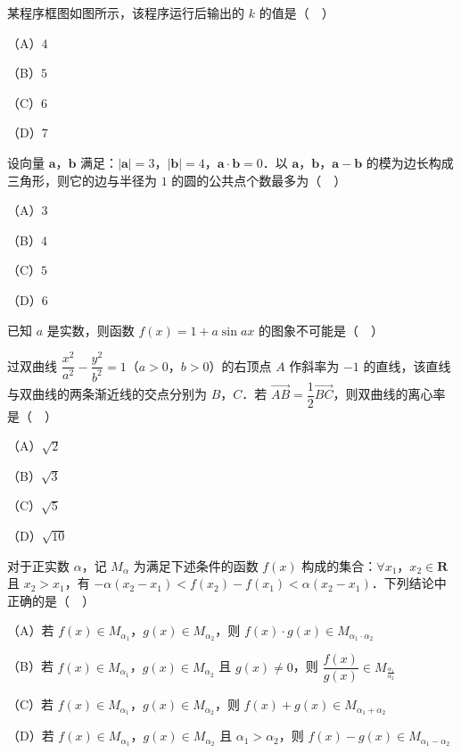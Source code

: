 \begingroup
\renewenvironment{question}{\Needspace{0.5\textheight}}{}
\begin{question}
某程序框图如图所示，该程序运行后输出的 $k$ 的值是（　）

（A）$4$

（B）$5$

（C）$6$

（D）$7$
\nopagebreak[4]
\begin{center}\end{center}
\nopagebreak[4]
\end{question}
\endgroup
\begin{question}
设向量 $\boldsymbol a$，$\boldsymbol b$ 满足：$|\boldsymbol a|=3$，$|\boldsymbol b|=4$，$\boldsymbol a\cdot\boldsymbol b=0$．以 $\boldsymbol a$，$\boldsymbol b$，$\boldsymbol a-\boldsymbol b$ 的模为边长构成三角形，则它的边与半径为 $1$ 的圆的公共点个数最多为（　）

（A）$3$

（B）$4$

（C）$5$

（D）$6$

\Needspace{0.4\textheight}
\end{question}
\begingroup
\renewenvironment{question}{\Needspace{0.5\textheight}}{}
\begin{question}
已知 $a$ 是实数，则函数 $f(x)=1+a\sin ax$ 的图象不可能是（　）
\nopagebreak[4]
\begin{center}\end{center}
\nopagebreak[4]
\end{question}
\endgroup
\begin{question}
过双曲线 $\dfrac{x^2}{a^2}-\dfrac{y^2}{b^2}=1$（$a>0$，$b>0$）的右顶点 $A$ 作斜率为 $-1$ 的直线，该直线与双曲线的两条渐近线的交点分别为 $B$，$C$．若 $\overrightarrow{AB}=\dfrac12\overrightarrow{BC}$，则双曲线的离心率是（　）

（A）$\sqrt2$

（B）$\sqrt3$

（C）$\sqrt5$

（D）$\sqrt{10}$

\end{question}
\begin{question}
对于正实数 $\alpha$，记 $M_\alpha$ 为满足下述条件的函数 $f(x)$ 构成的集合：$\forall x_1$，$x_2\in\mathbf R$ 且 $x_2>x_1$，有 $-\alpha(x_2-x_1)<f(x_2)-f(x_1)<\alpha(x_2-x_1)$．下列结论中正确的是（　）

（A）若 $f(x)\in M_{\alpha_1}$，$g(x)\in M_{\alpha_2}$，则 $f(x)\cdot g(x)\in M_{\alpha_1\cdot\alpha_2}$

（B）若 $f(x)\in M_{\alpha_1}$，$g(x)\in M_{\alpha_2}$ 且 $g(x)\neq0$，则 $\dfrac{f(x)}{g(x)}\in M_{\frac{\alpha_1}{\alpha_2}}$

（C）若 $f(x)\in M_{\alpha_1}$，$g(x)\in M_{\alpha_2}$，则 $f(x)+g(x)\in M_{\alpha_1+\alpha_2}$

（D）若 $f(x)\in M_{\alpha_1}$，$g(x)\in M_{\alpha_2}$ 且 $\alpha_1>\alpha_2$，则 $f(x)-g(x)\in M_{\alpha_1-\alpha_2}$

\end{question}


